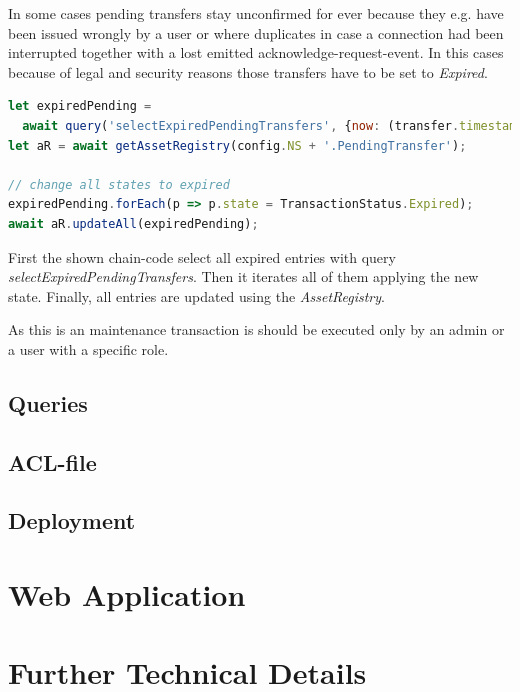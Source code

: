 In some cases pending transfers stay unconfirmed for ever because they e.g. have been issued wrongly by a user or where duplicates in case a connection had been interrupted together with a lost emitted acknowledge-request-event. In this cases because of legal and security reasons those transfers have to be set to \textit{Expired}.

\begin{center}
\begin{minipage}{0.8\textwidth}
\small
\begin{lstlisting}[language=javascript,firstnumber=1,caption={\bf\small clearDebt JavaScript excerpt}, captionpos=b,label=lst:js-cleanupPending]
let expiredPending =
  await query('selectExpiredPendingTransfers', {now: (transfer.timestamp)});
let aR = await getAssetRegistry(config.NS + '.PendingTransfer');

// change all states to expired
expiredPending.forEach(p => p.state = TransactionStatus.Expired);
await aR.updateAll(expiredPending);
\end{lstlisting}
\end{minipage}
\end{center}

First the shown chain-code select all expired entries with query \textit{selectExpiredPendingTransfers}. Then it iterates all of them applying the new state. Finally, all entries are updated using the \textit{AssetRegistry}.

As this is an maintenance transaction is should be executed only by an admin or a user with a specific role.

\subsection{Queries}
\label{subsec:queries}

\todo{}

\subsection{ACL-file}

\todo{}

\subsection{Deployment}

\todo{}


\section{Web Application}
\label{sec:webapp}


\section{Further Technical Details}
\label{sec:technical-details}

